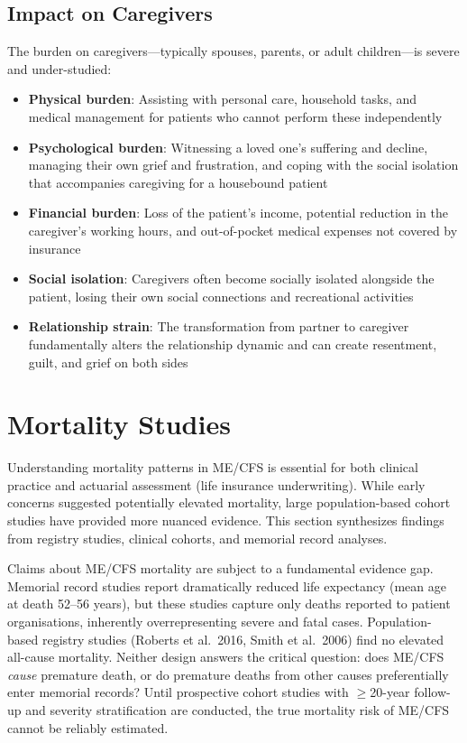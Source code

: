\subsection{Impact on Caregivers}

The burden on caregivers---typically spouses, parents, or adult children---is severe and under-studied:

\begin{itemize}
    \item \textbf{Physical burden}: Assisting with personal care, household tasks, and medical management for patients who cannot perform these independently
    \item \textbf{Psychological burden}: Witnessing a loved one's suffering and decline, managing their own grief and frustration, and coping with the social isolation that accompanies caregiving for a housebound patient
    \item \textbf{Financial burden}: Loss of the patient's income, potential reduction in the caregiver's working hours, and out-of-pocket medical expenses not covered by insurance
    \item \textbf{Social isolation}: Caregivers often become socially isolated alongside the patient, losing their own social connections and recreational activities
    \item \textbf{Relationship strain}: The transformation from partner to caregiver fundamentally alters the relationship dynamic and can create resentment, guilt, and grief on both sides
\end{itemize}

\section{Mortality Studies}
\label{sec:mortality}

Understanding mortality patterns in ME/CFS is essential for both clinical practice and actuarial assessment (life insurance underwriting). While early concerns suggested potentially elevated mortality, large population-based cohort studies have provided more nuanced evidence. This section synthesizes findings from registry studies, clinical cohorts, and memorial record analyses.

\begin{limitation}
Claims about ME/CFS mortality are subject to a fundamental evidence gap. Memorial record studies report dramatically reduced life expectancy (mean age at death 52--56 years), but these studies capture only deaths reported to patient organisations, inherently overrepresenting severe and fatal cases. Population-based registry studies (Roberts et al.\ 2016, Smith et al.\ 2006) find no elevated all-cause mortality. Neither design answers the critical question: does ME/CFS \emph{cause} premature death, or do premature deaths from other causes preferentially enter memorial records? Until prospective cohort studies with $\geq$20-year follow-up and severity stratification are conducted, the true mortality risk of ME/CFS cannot be reliably estimated.
\end{limitation}

